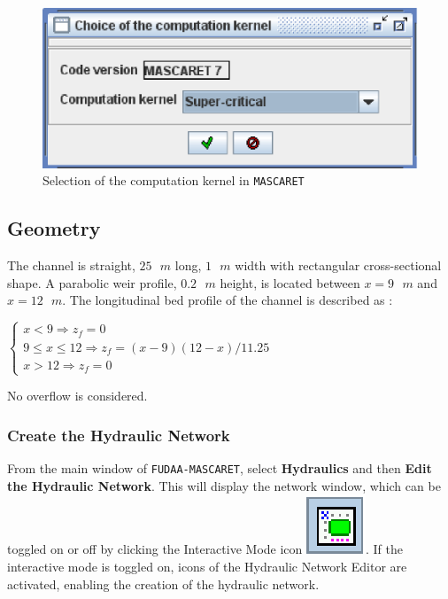 \documentclass[a4paper,12pt]{article}
\begin{document}
\begin{figure}[h]
  \begin{center}
  \includegraphics[scale=0.7]{kernel}
  \caption{Selection of the computation kernel in \texttt{MASCARET}}
  \label{fig:Selecting-the-computation}
  \end{center}
\end{figure}



\subsection{Geometry}

\hspace{0.5cm} The channel is straight, $25\mbox{ }m$ long, $1\mbox{ }m$ width with rectangular
cross-sectional shape. A parabolic weir profile, $0.2\mbox{ }m$ height, is located between $x = 9\mbox{ }m$ and $x = 12\mbox{ }m$. The longitudinal bed profile of the channel is described as : 

\vspace{0.5cm}

$\begin{cases}
x<9\Rightarrow z_{f}=0\\
9\leq x\leq12\Rightarrow z_{f}=(x-9)(12-x)/11.25\\
x>12\Rightarrow z_{f}=0
\end{cases}$

\vspace{0.5cm}

No overflow is considered.


\subsubsection{Create the Hydraulic Network}

\hspace{0.5cm} From the main window of \texttt{FUDAA-MASCARET}, select \textbf{Hydraulics} and then \textbf{Edit the Hydraulic Network}. This will display the network window, which can be toggled on or off by clicking the Interactive Mode icon \includegraphics[scale=0.6]{edit_nw}.
If the interactive mode is toggled on, icons of the Hydraulic
Network Editor are activated, enabling the creation of the hydraulic network.
\end{document}
